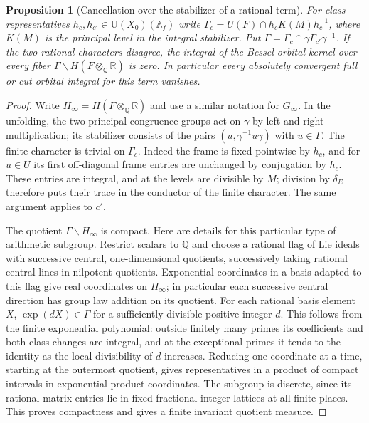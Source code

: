 \documentclass[a4paper,11pt]{article}
\newtheorem{proposition}{Proposition}[section]
\theoremstyle{definition}
\theoremstyle{remark}
\numberwithin{equation}{section}
\begin{document}
\begin{proposition}[Cancellation over the stabilizer of a rational term]
\leavevmode\label{prop:stabilizercancel680}
For class representatives \(h_c,h_{c'}\in\mathrm U(X_0)(\mathbb A_f)\)
write \(\Gamma_c=U(F)\cap h_c K(M) h_c^{-1}\), where \(K(M)\)
is the principal level in the integral stabilizer. Put
\(\Gamma=\Gamma_c\cap\gamma\Gamma_{c'}\gamma^{-1}\).
If the two rational characters disagree, the integral of the
Bessel orbital kernel over every fiber
\(\Gamma\backslash H(F\otimes_{\mathbb Q}\mathbb R)\) is zero.
In particular every absolutely convergent full or cut orbital
integral for this term vanishes.
\end{proposition}
\begin{proof}
Write \(H_\infty=H(F\otimes_{\mathbb Q}\mathbb R)\) and use a
similar notation for \(G_\infty\). In the unfolding, the two
principal congruence groups act on \(\gamma\) by left and right
multiplication; its stabilizer consists of the pairs
\((u,\gamma^{-1}u\gamma)\) with \(u\in\Gamma\).
The finite character is trivial on \(\Gamma_c\).
Indeed the frame is fixed pointwise by \(h_c\), and for \(u\in U\)
its first off-diagonal frame entries are unchanged by conjugation
by \(h_c\). These entries are integral, and at the levels are
divisible by \(M\); division by \(\delta_E\) therefore puts their
trace in the conductor of the finite character. The same argument
applies to \(c'\).

The quotient \(\Gamma\backslash H_\infty\) is compact. Here are
details for this particular type of arithmetic subgroup. Restrict
scalars to \(\mathbb Q\) and choose a rational flag of Lie ideals
with successive central, one-dimensional quotients, successively
taking rational central lines in nilpotent quotients. Exponential
coordinates in a basis adapted to this flag give real coordinates
on \(H_\infty\); in particular each successive central direction
has group law addition on its quotient. For each rational basis
element \(X\), \(\exp(dX)\in\Gamma\) for a sufficiently divisible
positive integer \(d\). This follows from the finite exponential
polynomial: outside finitely many primes its coefficients and
both class changes are integral, and at the exceptional primes
it tends to the identity as the local divisibility of \(d\)
increases. Reducing one coordinate at a time, starting at the
outermost quotient, gives representatives in a product of compact
intervals in exponential product coordinates. The subgroup is
discrete, since its rational matrix entries lie in fixed fractional
integer lattices at all finite places. This proves compactness and
gives a finite invariant quotient measure.


\end{proof}
\end{document}
